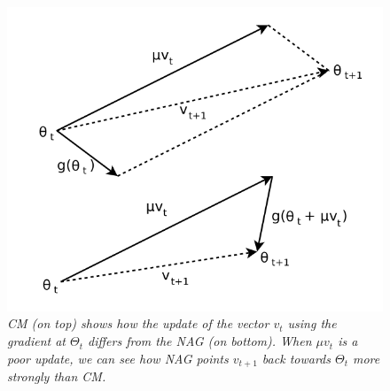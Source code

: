 \begin{figure}[H]
	\centering
	\includegraphics[width=0.4\linewidth]{res/CMvsNAG.png}
	\caption{\textit{\textit{CM} (on top) shows how the update of the vector $v_t$ using the gradient at $\Theta_t$ differs from the \textit{NAG} (on bottom). When $\mu v_t$ is a poor update, we can see how \textit{NAG} points $v_{t+1}$ back towards $\Theta_t$ more strongly than \textit{CM}.}}
	\label{fig:NAGvsCM}
\end{figure}

